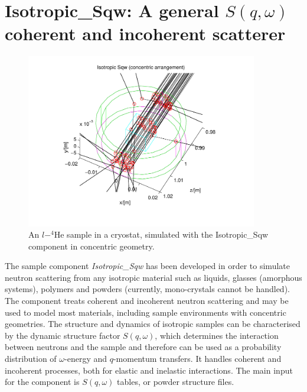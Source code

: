 \section{Isotropic\_Sqw: A general $S(q,\omega)$ coherent and incoherent scatterer}
\label{s:isotropic-sqw}


\begin{figure}
  \begin{center}
    \includegraphics[width=0.9\textwidth]{figures/sqw}
  \end{center}
\caption{An $l-^4$He sample in a cryostat, simulated with the Isotropic\_Sqw component in concentric geometry.}
\label{f:isotropic-sqw}
\end{figure}

The sample component \emph{Isotropic\_Sqw} has been developed in order to simulate neutron scattering from any isotropic material such as liquids, glasses (amorphous systems), polymers and powders (currently, mono-crystals cannot be handled).
The component treats coherent and incoherent neutron scattering and may be used to model most materials, including sample environments with concentric geometries.
The structure and dynamics of isotropic samples can be characterised by the dynamic structure factor $S(q,\omega)$, which determines the interaction between neutrons and the sample and therefore can be used as a probability distribution of $\omega$-energy and $q$-momentum transfers. It handles coherent and incoherent processes, both for elastic and inelastic interactions.
The main input for the component is $S(q,\omega)$ tables, or powder structure files.

